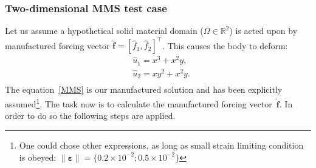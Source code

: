 \documentclass{report}
\newcommand{\bff}{\textbf{f}}
\newcommand{\eps}{\boldsymbol{\varepsilon}}
\begin{document}
\subsubsection{Two-dimensional MMS test case}\label{SS:2dMMS}


Let us assume a hypothetical solid material domain ($\Omega\in\mathbb{R}^2$) is acted upon by manufactured forcing vector $\widehat{\bff}=[\widehat{f}_1,\widehat{f}_2]^\top$. This causes the body to deform:
%
\begin{equation}\label{MMS}
\begin{aligned}
&\widehat{u}_1=x^3+x^2y,\\
&\widehat{u}_2=xy^2+x^2y.\\
\end{aligned}
\end{equation}
%
The equation~\eqref{MMS} is our manufactured solution and has been explicitly assumed\footnote{One could chose other expressions, as long as small strain limiting condition is obeyed: $\|\eps\|=\{0.2\times10^{-2};0.5\times10^{-2}\}$}. The task now is to calculate the manufactured forcing vector~$\widehat{\bff}$. In order to do so the following steps are applied.
\end{document}

